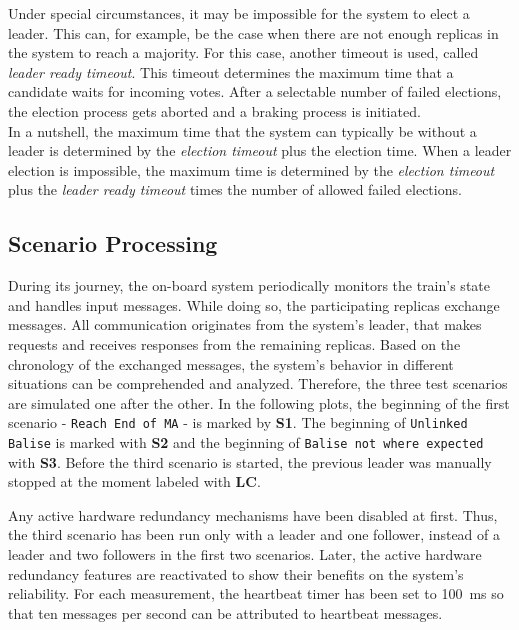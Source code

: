 Under special circumstances, it may be impossible for the system to elect a leader.
This can, for example, be the case when there are not enough replicas in the system to reach a majority.
For this case, another timeout is used, called \textit{leader ready timeout}.
This timeout determines the maximum time that a candidate waits for incoming votes.
After a selectable number of failed elections, the election process gets aborted and a braking process is initiated.
\\

In a nutshell, the maximum time that the system can typically be without a leader is determined by the \textit{election timeout} plus the election time.
When a leader election is impossible, the maximum time is determined by the \textit{election timeout} plus the \textit{leader ready timeout} times the number of allowed failed elections.

\subsection{Scenario Processing}

During its journey, the on-board system periodically monitors the train's state and handles input messages.
While doing so, the participating replicas exchange messages.
All communication originates from the system's leader, that makes requests and receives responses from the remaining replicas.
Based on the chronology of the exchanged messages, the system's behavior in different situations can be comprehended and analyzed.
Therefore, the three test scenarios are simulated one after the other.
In the following plots, the beginning of the first scenario - \texttt{Reach End of MA} - is marked by \textbf{S1}.
The beginning of \texttt{Unlinked Balise} is marked with \textbf{S2} and the beginning of \texttt{Balise not where expected} with \textbf{S3}.
Before the third scenario is started, the previous leader was manually stopped at the moment labeled with \textbf{LC}.

Any active hardware redundancy mechanisms have been disabled at first.
Thus, the third scenario has been run only with a leader and one follower, instead of a leader and two followers in the first two scenarios.
Later, the active hardware redundancy features are reactivated to show their benefits on the system's reliability.
For each measurement, the heartbeat timer has been set to 100~ms so that ten messages per second can be attributed to heartbeat messages.
\\

